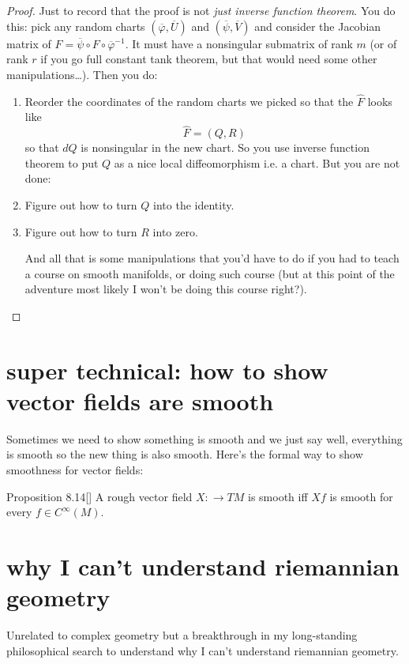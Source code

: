 \begin{proof}\leavevmode
Just to record that the proof is not \textit{just inverse function theorem}. You do this: pick any random charts \((\overline{\varphi},\overline{U})\) and \((\overline{\psi},\overline{V})\) and consider the Jacobian matrix of \(\hat{F}=\overline{\psi}\circ F \circ \overline{\varphi}^{-1}\). It must have a nonsingular submatrix of rank \(m\) (or of rank \(r\) if you go full constant tank theorem, but that would need some other manipulations…). Then you do:
\begin{enumerate}
\item Reorder the coordinates of the random charts we picked so that the \(\hat{F}\) looks like
	\[\hat{F}=(Q,R)\]
	so that \(dQ\) is nonsingular in the new chart. So you use inverse function theorem to put \(Q\) as a nice local diffeomorphism i.e. a chart. But you are not done:
 \item Figure out how to turn \(Q\) into the identity.
\item Figure out how to turn \(R\) into zero.

	And all that is some manipulations that you'd have to do if you had to teach a course on smooth manifolds, or doing such course (but at this point of the adventure most likely I won't be doing this course right?).
\end{enumerate}
\end{proof}

\section{super technical: how to show vector fields are smooth}

Sometimes we need to show something is smooth and we just say well, everything is smooth so the new thing is also smooth. Here's the formal way to show smoothness for vector fields:

\begin{thing7}{Proposition 8.14}[\cite{les}]\leavevmode
A rough vector field \(X : \to TM\) is smooth iff \(Xf\) is smooth for every \(f\in C^\infty(M)\).
\end{thing7}

\section{why I can't understand riemannian geometry}

Unrelated to complex geometry but a breakthrough in my long-standing philosophical search to understand why I can't understand riemannian geometry.

